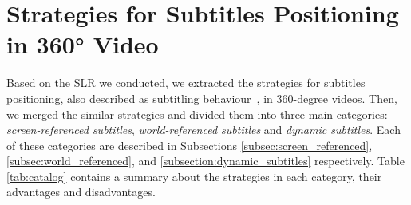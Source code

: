 \section{Strategies for Subtitles Positioning in 360° Video}
\label{sec:subtitles}
Based on the SLR we conducted, we extracted the strategies for subtitles positioning, also described as subtitling behaviour~\cite{brown_subtitles_2017}, in 360-degree videos. Then, we merged the similar strategies and divided them into three main categories: \emph{screen-referenced subtitles}, \emph{world-referenced subtitles} and \emph{dynamic subtitles}. Each of these categories are described in Subsections \ref{subsec:screen_referenced}, \ref{subsec:world_referenced}, and \ref{subsection:dynamic_subtitles} respectively. Table \ref{tab:catalog} contains a summary about the strategies in each category, their advantages and disadvantages.

